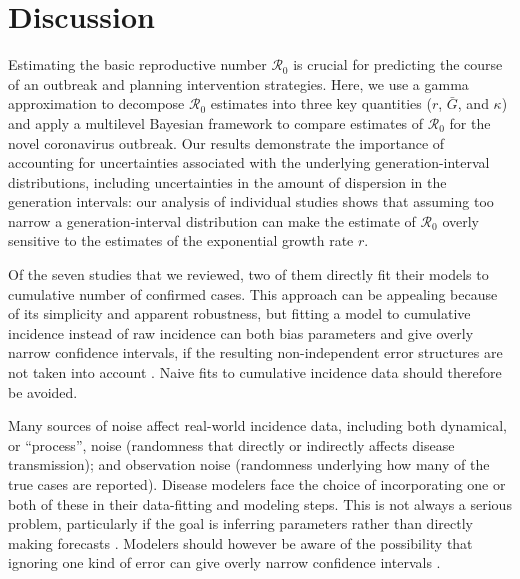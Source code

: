 \documentclass[12pt]{article}
\newcommand{\Ro}{\ensuremath{{\mathcal R}_{0}}\xspace}
\begin{document}
\section{Discussion}

Estimating the basic reproductive number \Ro is crucial for predicting the course of an outbreak and planning intervention strategies.
Here, we use a gamma approximation \cite{park2019practical} to decompose \Ro estimates into three key quantities ($r$, $\bar G$, and $\kappa$) and apply a multilevel Bayesian framework to compare estimates of \Ro for the novel coronavirus outbreak.
Our results demonstrate the importance of accounting for uncertainties associated with the underlying generation-interval distributions, including uncertainties in the amount of dispersion in the generation intervals:
our analysis of individual studies shows that assuming too narrow a generation-interval distribution can make the estimate of \Ro overly sensitive to the estimates of the exponential growth rate $r$.

Of the seven studies that we reviewed, two of them directly fit their models to cumulative number of confirmed cases.
This approach can be appealing because of its simplicity and apparent robustness, but fitting a model to cumulative incidence instead of raw incidence can both bias parameters and give overly narrow confidence intervals, if the resulting non-independent error structures are not taken into account \cite{ma2014estimating, king2015avoidable}.
Naive fits to cumulative incidence data should therefore be avoided.

Many sources of noise affect real-world incidence data, including both dynamical, or ``process'', noise (randomness that directly or indirectly affects disease transmission); and observation noise (randomness underlying how many of the true cases are reported).  
Disease modelers face the choice of incorporating one or both of these in their data-fitting and modeling steps. 
This is not always a serious problem, particularly if the goal is inferring parameters rather than directly making forecasts \cite{ma2014estimating}.
Modelers should however be aware of the possibility that ignoring one kind of error can give overly narrow confidence intervals \cite{king2015avoidable,taylor2016stochasticity}.
\end{document}

